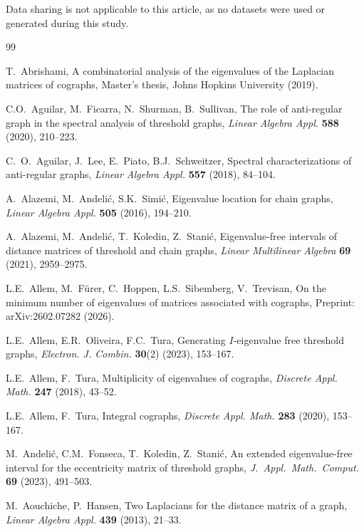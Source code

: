 \documentclass[11pt]{article}
\theoremstyle{plain}
\theoremstyle{definition}
\theoremstyle{remark}
\begin{document}
	Data sharing is not applicable to this article, as no datasets were used or generated during this
	study.
	
	
	\begin{thebibliography}{99}
		
		 T.~Abrishami, A combinatorial analysis of the eigenvalues of the Laplacian matrices of cographs, Master's thesis, Johns Hopkins University (2019).
		
		 C.O.~Aguilar, M.~Ficarra, N.~Shurman, B.~Sullivan, The role of anti-regular graph in the spectral analysis of threshold graphs, \emph{Linear Algebra Appl.} \textbf{588} (2020), 210--223.
		
		 C.~O.~Aguilar, J.~Lee, E.~Piato, B.J.~Schweitzer, Spectral characterizations of anti-regular graphs, \emph{Linear Algebra Appl.} \textbf{557} (2018), 84--104.
		
		 A.~Alazemi, M.~Andelić, S.K.~Simić, Eigenvalue location for chain graphs, \emph{Linear Algebra Appl.} \textbf{505} (2016), 194--210.
		
		 A.~Alazemi, M.~Andelić, T.~Koledin, Z.~Stanić, Eigenvalue-free intervals of distance matrices of threshold and chain graphs, \emph{Linear Multilinear Algebra} \textbf{69} (2021), 2959--2975.
		
		 L.E.~Allem, M.~F\"urer, C.~Hoppen, L.S.~Sibemberg, V.~Trevisan, On the minimum number of eigenvalues of matrices associated with cographs, Preprint: arXiv:2602.07282 (2026).
		
		 L.E.~Allem, E.R.~Oliveira, F.C.~Tura, Generating $I$-eigenvalue free threshold graphs, \emph{Electron. J. Combin.} \textbf{30}(2) (2023), 153--167.
		
		 L.E.~Allem, F.~Tura, Multiplicity of eigenvalues of cographs, \emph{Discrete Appl. Math.} \textbf{247} (2018), 43--52.
		
		 L.E.~Allem, F.~Tura, Integral cographs, \emph{Discrete Appl. Math.} \textbf{283} (2020), 153--167.
		
		 M.~Andeli\'c, C.M.~Fonseca, T.~Koledin, Z.~Stani\'c, An extended eigenvalue-free interval for the eccentricity matrix of threshold graphs, \emph{J.\ Appl.\ Math.\ Comput.} \textbf{69} (2023), 491--503.
		
		 M.~Aouchiche, P.~Hansen, Two Laplacians for the distance matrix of a graph, \emph{Linear Algebra Appl.} \textbf{439} (2013), 21--33.
		

\end{thebibliography}
\end{document}
